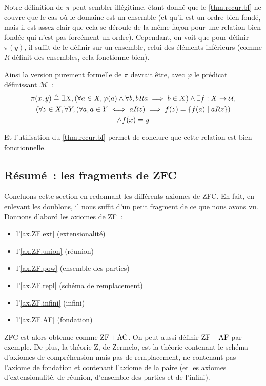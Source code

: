 \begin{remark}
  Notre définition de $\pi$ peut sembler illégitime, étant donné que le
  \cref{thm.recur.bf} ne couvre que le cas où le domaine est un ensemble (et
  qu'il est un ordre bien fondé, mais il est assez clair que cela se déroule de
  la même façon pour une relation bien fondée qui n'est pas forcément un ordre).
  Cependant, on voit que pour définir $\pi(y)$, il suffit de le définir sur
  un ensemble, celui des éléments inférieurs (comme $R$ définit des ensembles,
  cela fonctionne bien).

  Ainsi la version purement formelle de $\pi$ devrait être, avec $\varphi$ le
  prédicat définissant $\mathcal M$~:
  \begin{multline*}
    \pi(x,y) \triangleq \exists X,
    (\forall a \in X, \varphi(a) \land \forall b, b R a \implies b \in X)
    \land \exists f : X \to \mathcal U, \\(\forall z\in X,
    \forall Y, (\forall a, a \in Y \iff a R z) \implies
    f(z) = \{f(a) \mid a R z\})\\
    \land f(x) = y
  \end{multline*}

  Et l'utilisation du \cref{thm.recur.bf} permet de conclure que cette relation
  est bien fonctionnelle.
\end{remark}

\subsection{Résumé~: les fragments de ZFC}

Concluons cette section en redonnant les différents axiomes de ZFC. En fait,
en enlevant les doublons, il nous suffit d'un petit fragment de ce que nous
avons vu. Donnons d'abord les axiomes de ZF~:
\begin{itemize}
\item l'\cref{ax.ZF.ext} (extensionalité)
\item l'\cref{ax.ZF.union} (réunion)
\item l'\cref{ax.ZF.pow} (ensemble des parties)
\item l'\cref{ax.ZF.repl} (schéma de remplacement)
\item l'\cref{ax.ZF.infini} (infini)
\item l'\cref{ax.ZF.AF} (fondation)
\end{itemize}
ZFC est alors obtenue comme $\operatorname{ZF} + \operatorname{AC}$. On peut aussi définir
$\operatorname{ZF} - \operatorname{AF}$ par exemple. De plus, la théorie Z, de Zermelo, est la théorie
contenant le schéma d'axiomes de compréhension mais pas de remplacement,
ne contenant pas l'axiome de fondation et contenant l'axiome de la paire (et les
axiomes d'extensionalité, de réunion, d'ensemble des parties et de l'infini).

